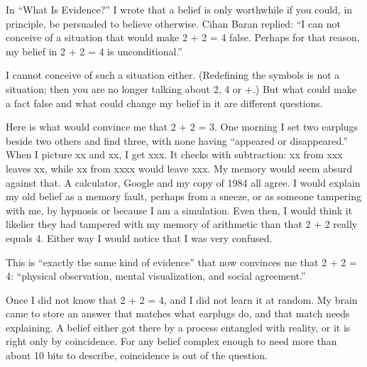
In ``What Is Evidence?'' I wrote that a belief is only worthwhile if you could, in principle, be persuaded to believe otherwise. Cihan Baran replied: ``I can not conceive of a situation that would make 2 + 2 = 4 false. Perhaps for that reason, my belief in 2 + 2 = 4 is unconditional.'' 

I cannot conceive of such a situation either. (Redefining the symbols is not a situation; then you are no longer talking about 2, 4 or +.) But what could make a fact false and what could change my belief in it are different questions.

Here is what would convince me that 2 + 2 = 3. One morning I set two earplugs beside two others and find three, with none having ``appeared or disappeared.'' When I picture xx and xx, I get xxx. It checks with subtraction: xx from xxx leaves xx, while xx from xxxx would leave xxx. My memory would seem absurd against that. A calculator, Google and my copy of \textsc{1984} all agree.  I would explain my old belief as a memory fault, perhaps from a sneeze, or as someone tampering with me, by hypnosis or because I am a simulation. Even then, I would think it likelier they had tampered with my memory of arithmetic than that 2 + 2 really equals 4. Either way I would notice that I was very confused. 

This is ``exactly the same kind of evidence'' that now convinces me that 2 + 2 = 4: ``physical observation, mental visualization, and social agreement.'' 

Once I did not know that 2 + 2 = 4, and I did not learn it at random.  My brain came to store an answer that matches what earplugs do, and that match needs explaining. A belief either got there by a process entangled with reality, or it is right only by coincidence. For any belief complex enough to need more than about 10 bits to describe, coincidence is out of the question.


